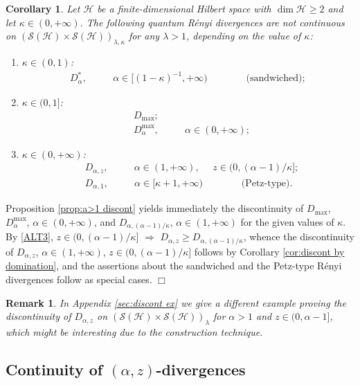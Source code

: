 \documentclass[unsortedaddress,superscriptaddress,pra,notitlepage]{revtex4}
\newtheorem{rem}[definition]{Remark}
\newtheorem{cor}[definition]{Corollary}
\newenvironment{proof}[1][Proof]{\begin{trivlist}
\item[\hskip \labelsep {\bfseries #1}]}{\hfill$\Box$\end{trivlist}}
\def\S{{\mathcal S}}
\def\hil{{\mathcal H}}
\def\imp{\Longrightarrow}
\def\inv{^{-1}}
\def\nw{^{*}}
\def\pwr{\kappa}
\newcommand{\ds}{\mbox{ }\mbox{ }}
\begin{document}
\begin{cor}\label{cor:discont examples}
Let $\hil$ be a finite-dimensional Hilbert space with $\dim\hil \ge 2$ and let $\pwr\in(0,+\infty)$. 
The following quantum R\'enyi divergences are not continuous on 
$(\S(\hil)\times\S(\hil))_{\lambda,\pwr}$ for any $\lambda>1$, depending on the value of 
$\pwr$:
\begin{enumerate}
\item
$\pwr\in(0,1)$:
\begin{align*}
D_{\alpha}\nw,\ds\ds\alpha\in[(1-\pwr)\inv,+\infty) \ds\ds\ds\text{(sandwiched)};
\end{align*}
\item
$\pwr\in(0,1]$:
\begin{align*}
&D_{\max};\\
&D_{\alpha}^{\max}, \ds\ds\alpha\in(0,+\infty);
\end{align*}
\item
$\pwr\in(0,+\infty)$:
\begin{align*}
&D_{\alpha,z}, \ds\ds\alpha\in(1,+\infty),\ds z\in(0,(\alpha-1)/\pwr];\\
&D_{\alpha,1},\ds\ds\alpha\in[\pwr+1,+\infty)\ds\ds\ds\text{(Petz-type).}
\end{align*}
\end{enumerate}
\end{cor}
\begin{proof}
Proposition \ref{prop:a>1 discont} yields immediately 
the discontinuity of $D_{\max}$, $D_{\alpha}^{\max}$, $\alpha\in(0,+\infty)$, and 
$D_{\alpha,(\alpha-1)/\pwr}$, $\alpha\in(1,+\infty)$ for the given values of $\pwr$. 
By \eqref{ALT3}, $z\in(0,(\alpha-1)/\pwr]$ $\imp$ $D_{\alpha,z}\ge D_{\alpha,(\alpha-1)/\pwr}$, whence the 
discontinuity of $D_{\alpha,z}$, $\alpha\in(1,+\infty)$, $z\in(0,(\alpha-1)/\pwr]$ follows
by Corollary \ref{cor:discont by domination}, and 
the assertions about the sandwiched and the Petz-type R\'enyi divergences follow as special cases. 
\end{proof}

\begin{rem}
In Appendix \ref{sec:discont ex}
we give a different example proving the discontinuity of 
$D_{\alpha,z}$ on $(\S(\hil)\times\S(\hil))_{\lambda}$ for 
$\alpha>1$ and $z\in(0,\alpha-1]$, which might be interesting 
due to the construction technique.
\end{rem}


\subsection{Continuity of $(\alpha,z)$-divergences}
\label{sec:cont}
\end{document}
